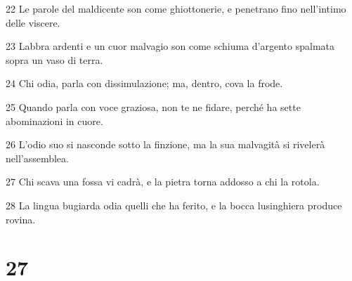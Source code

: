 \par 22 Le parole del maldicente son come ghiottonerie, e penetrano fino nell'intimo delle viscere.
\par 23 Labbra ardenti e un cuor malvagio son come schiuma d'argento spalmata sopra un vaso di terra.
\par 24 Chi odia, parla con dissimulazione; ma, dentro, cova la frode.
\par 25 Quando parla con voce graziosa, non te ne fidare, perché ha sette abominazioni in cuore.
\par 26 L'odio suo si nasconde sotto la finzione, ma la sua malvagità si rivelerà nell'assemblea.
\par 27 Chi scava una fossa vi cadrà, e la pietra torna addosso a chi la rotola.
\par 28 La lingua bugiarda odia quelli che ha ferito, e la bocca lusinghiera produce rovina.

\chapter{27}


